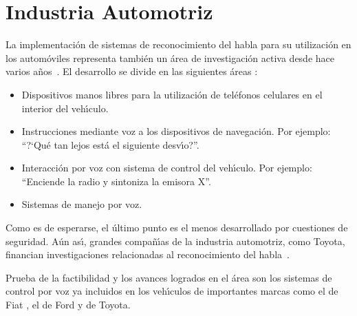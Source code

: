 \section{Industria Automotriz}
\label{sec:automotriz}

La implementaci\'on de sistemas de reconocimiento del habla para su utilizaci\'on en los autom\'oviles representa
tambi\'en un \'area de investigaci\'on activa desde hace varios \mbox{a\~nos \cite{HanaiS94, HuaSpeech2010}}. 
El desarrollo se divide en las siguientes \'areas \cite{Kirriemuir2003Speech}:

\begin{itemize}
	\item Dispositivos manos libres para la utilizaci\'on de tel\'efonos celulares en el interior del veh{\'\i}culo.
	\item Instrucciones mediante voz a los dispositivos de navegaci\'on. Por ejemplo: ``{?`}Qu\'e tan lejos est\'a el siguiente desv{\'\i}o?''.
	\item Interacci\'on por voz con sistema de control del veh{\'\i}culo. Por ejemplo: ``Enciende la radio y sintoniza la emisora X''.
	\item Sistemas de manejo por voz.
\end{itemize}

Como es de esperarse, el \'ultimo punto es el menos desarrollado por cuestiones de seguridad. A\'un as{\'\i}, grandes compa\~n{\'\i}as
de la industria automotriz, como Toyota, financian investigaciones relacionadas al reconocimiento del \mbox{habla \cite{HoshinoSpeech2004}}.

Prueba de la factibilidad y los avances logrados en el \'area son los sistemas de control por voz ya incluidos en los
veh{\'\i}culos de importantes marcas como el  de Fiat \cite{FiatBlue}, el  de Ford \cite{FordSync}
y  \cite{ToyotaEntune} de Toyota.
